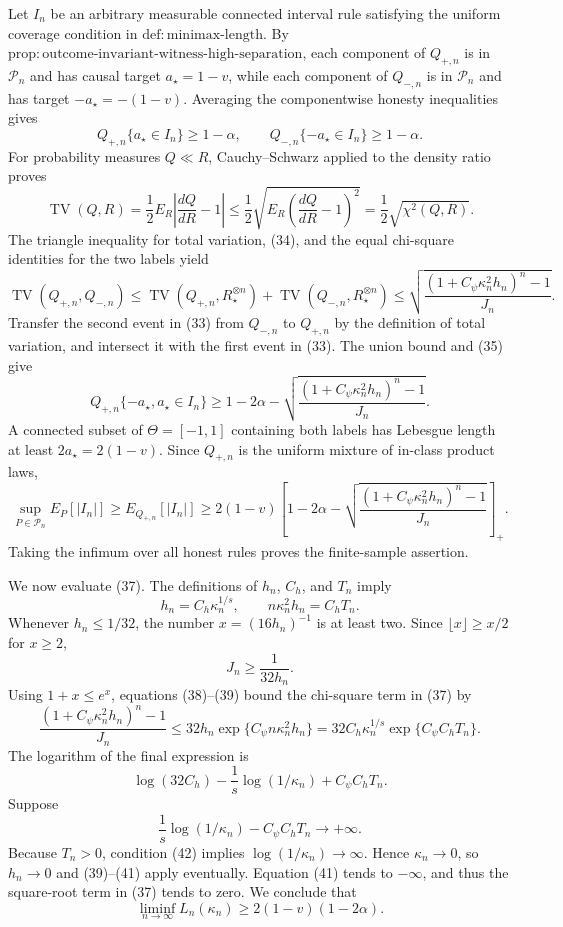 Let \(I_n\) be an arbitrary measurable connected interval rule satisfying the uniform coverage condition in \(\mathrm{def:minimax\mbox{-}length}\).  By \(\mathrm{prop:outcome\mbox{-}invariant\mbox{-}witness\mbox{-}high\mbox{-}separation}\), each component of \(Q_{+,n}\) is in \(\mathcal P_n\) and has causal target \(a_\star=1-v\), while each component of \(Q_{-,n}\) is in \(\mathcal P_n\) and has target \(-a_\star=-(1-v)\).  Averaging the componentwise honesty inequalities gives
\[
Q_{+,n}\{a_\star\in I_n\}\ge1-\alpha,
\qquad
Q_{-,n}\{-a_\star\in I_n\}\ge1-\alpha.
\tag{33}
\]
For probability measures \(Q\ll R\), Cauchy--Schwarz applied to the density ratio proves
\[
\operatorname{TV}(Q,R)
=\frac12E_R\left|\frac{dQ}{dR}-1\right|
\le\frac12\sqrt{E_R\left(\frac{dQ}{dR}-1\right)^2}
=\frac12\sqrt{\chi^2(Q,R)}.
\tag{34}
\]
The triangle inequality for total variation, (34), and the equal chi-square identities for the two labels yield
\[
\operatorname{TV}(Q_{+,n},Q_{-,n})
\le\operatorname{TV}(Q_{+,n},R_\star^{\otimes n})
   +\operatorname{TV}(Q_{-,n},R_\star^{\otimes n})
\le
\sqrt{\frac{\left(1+C_\psi\kappa_n^2h_n\right)^n-1}{J_n}}.
\tag{35}
\]
Transfer the second event in (33) from \(Q_{-,n}\) to \(Q_{+,n}\) by the definition of total variation, and intersect it with the first event in (33).  The union bound and (35) give
\[
Q_{+,n}\{-a_\star,a_\star\in I_n\}
\ge1-2\alpha-
\sqrt{\frac{\left(1+C_\psi\kappa_n^2h_n\right)^n-1}{J_n}}.
\tag{36}
\]
A connected subset of \(\Theta=[-1,1]\) containing both labels has Lebesgue length at least \(2a_\star=2(1-v)\).  Since \(Q_{+,n}\) is the uniform mixture of in-class product laws,
\[
\sup_{P\in\mathcal P_n}E_P[|I_n|]
\ge E_{Q_{+,n}}[|I_n|]
\ge2(1-v)\left[
1-2\alpha-
\sqrt{\frac{\left(1+C_\psi\kappa_n^2h_n\right)^n-1}{J_n}}
\right]_+.
\tag{37}
\]
Taking the infimum over all honest rules proves the finite-sample assertion.

We now evaluate (37).  The definitions of \(h_n\), \(C_h\), and \(T_n\) imply
\[
h_n=C_h\kappa_n^{1/s},
\qquad
n\kappa_n^2h_n=C_hT_n.
\tag{38}
\]
Whenever \(h_n\le1/32\), the number \(x=(16h_n)^{-1}\) is at least two.  Since \(\lfloor x\rfloor\ge x/2\) for \(x\ge2\),
\[
J_n\ge\frac1{32h_n}.
\tag{39}
\]
Using \(1+x\le e^x\), equations (38)--(39) bound the chi-square term in (37) by
\[
\frac{\left(1+C_\psi\kappa_n^2h_n\right)^n-1}{J_n}
\le32h_n\exp\{C_\psi n\kappa_n^2h_n\}
=32C_h\kappa_n^{1/s}\exp\{C_\psi C_hT_n\}.
\tag{40}
\]
The logarithm of the final expression is
\[
\log(32C_h)-\frac1s\log(1/\kappa_n)+C_\psi C_hT_n.
\tag{41}
\]
Suppose
\[
\frac1s\log(1/\kappa_n)-C_\psi C_hT_n\longrightarrow+\infty.
\tag{42}
\]
Because \(T_n>0\), condition (42) implies \(\log(1/\kappa_n)\to\infty\).  Hence \(\kappa_n\to0\), so \(h_n\to0\) and (39)--(41) apply eventually.  Equation (41) tends to \(-\infty\), and thus the square-root term in (37) tends to zero.  We conclude that
\[
\liminf_{n\to\infty}L_n(\kappa_n)
\ge2(1-v)(1-2\alpha).
\tag{43}
\]

